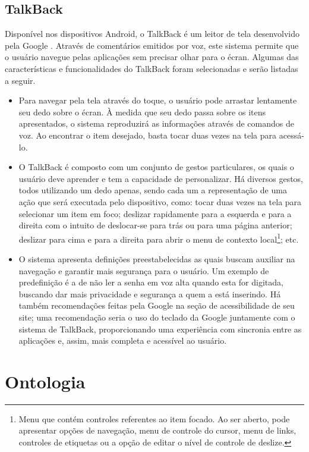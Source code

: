 \subsection{TalkBack}

Disponível nos dispositivos Android, o TalkBack é um leitor de tela desenvolvido pela Google \cite{TALKB2016}. Através de comentários emitidos por voz, este sistema permite que o usuário navegue pelas aplicações sem precisar olhar para o écran. Algumas das características e funcionalidades do TalkBack foram selecionadas e serão listadas a seguir.
\begin{itemize}
	\item Para navegar pela tela através do toque, o usuário pode arrastar lentamente seu dedo sobre o écran. À medida que seu dedo passa sobre os itens apresentados, o sistema reproduzirá as informações através de comandos de voz. Ao encontrar o item desejado, basta tocar duas vezes na tela para acessá-lo.
	\item O TalkBack é composto com um conjunto de gestos particulares, os quais o usuário deve aprender e tem a capacidade de personalizar. Há diversos gestos, todos utilizando um dedo apenas, sendo cada um a representação de uma ação que será executada pelo dispositivo, como: tocar duas vezes na tela para selecionar um item em foco; deslizar rapidamente para a esquerda e para a direita com o intuito de deslocar-se para trás ou para uma página anterior; deslizar para cima e para a direita para abrir o menu de contexto local\footnote{Menu que contém controles referentes ao item focado. Ao ser aberto, pode apresentar opções de navegação, menu de controle do cursor, menu de links, controles de etiquetas ou a opção de editar o nível de controle de deslize.}; etc.
	\item O sistema apresenta definições preestabelecidas as quais buscam auxiliar na navegação e garantir mais segurança para o usuário. Um exemplo de predefinição é a de não ler a senha em voz alta quando esta for digitada, buscando dar mais privacidade e segurança a quem a está inserindo. Há também recomendações feitas pela Google na seção de acessibilidade de seu site; uma recomendação seria o uso do teclado da Google juntamente com o sistema de TalkBack, proporcionando uma experiência com sincronia entre as aplicações e, assim, mais completa e acessível ao usuário.
\end{itemize}

\section{Ontologia}

